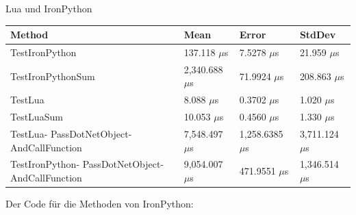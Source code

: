 Lua und IronPython
     \begin{table}[H]
            \begin{tabular}{|p{3.5cm}|p{3cm}|p{3cm}|p{3cm}|}
            \hline
                Method &   Mean &   Error & StdDev \\ \hline
                TestIronPython & 137.118 $\mu$s & 7.5278 $\mu$s & 21.959 $\mu$s \\ \hline
                TestIronPythonSum & 2,340.688 $\mu$s & 71.9924 $\mu$s & 208.863 $\mu$s \\ \hline
                TestLua & 8.088 $\mu$s & 0.3702 $\mu$s & 1.020 $\mu$s \\ \hline
                TestLuaSum & 10.053 $\mu$s & 0.4560 $\mu$s & 1.330 $\mu$s \\ \hline
                TestLua-
                PassDotNetObject- 
                AndCallFunction & 7,548.497 $\mu$s & 1,258.6385 $\mu$s & 3,711.124 $\mu$s \\ \hline
                TestIronPython-
                PassDotNetObject- 
                AndCallFunction & 9,054.007 $\mu$s & 471.9551 $\mu$s & 1,346.514 $\mu$s \\ \hline
            \end{tabular}
    \end{table}
\newpage
    Der Code für die Methoden von IronPython:
